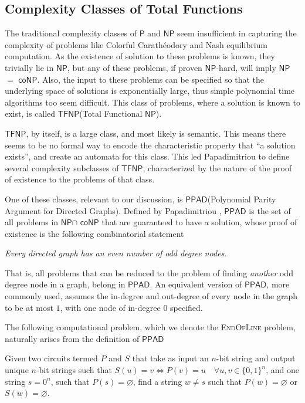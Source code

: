 \documentclass[a4paper,11pt]{article}
\def\cc#1{\mathsf{#1}}
\def\PPAD{\ensuremath{\cc{PPAD}}\xspace}
\def\P{\ensuremath{\cc{P}}\xspace}
\def\NP{\ensuremath{\cc{NP}}\xspace}
\def\TFNP{\ensuremath{\cc{TFNP}}\xspace}
\def\coNP{\ensuremath{\cc{coNP}}\xspace}
\def\problem#1{\textsc{#1}}
\def\EOL{\problem{EndOfLine}\xspace}
\def\CC{Colorful Carath\'eodory }
\begin{document}
\subsection{Complexity Classes of Total Functions}

\par The traditional complexity classes of \P and \NP seem insufficient in capturing the complexity of problems like \CC and Nash equilibrium computation. As the existence of solution to these problems is known, they trivially lie in \NP, but any of these problems, if proven \NP-hard, will imply \NP $=$ \coNP \cite{CP}. Also, the input to these problems can be specified so that the underlying space of solutions is exponentially large, thus simple polynomial time algorithms too seem difficult. This class of problems, where a solution is known to exist, is called \TFNP (Total Functional \NP). 

\par \TFNP, by itself, is a large class, and most likely is semantic. This means there seems to be no formal way to encode the characteristic property that ``a solution exists'', and create an automata for this class. This led Papadimitriou to define several complexity subclasses of \TFNP, characterized by the nature of the proof of existence to the problems of that class. 

\par One of these classes, relevant to our discussion, is \PPAD (Polynomial Parity Argument for Directed Graphs). Defined by Papadimitriou \cite{CP}, \PPAD is the set of all problems in \NP $\cap$ \coNP that are guaranteed to have a solution, whose proof of existence is the following combinatorial statement

\begin{center}
\textit{Every directed graph has an even number of odd degree nodes.}
\end{center}

\par That is, all problems that can be reduced to the problem of finding \textit{another} odd degree node in a graph, belong in \PPAD. An equivalent version of \PPAD, more commonly used, assumes the in-degree and out-degree of every node in the graph to be at most $1$, with one node of in-degree $0$ specified.  

\par The following computational problem, which we denote the \EOL problem, naturally arises from the definition of \PPAD

\begin{definition}[\EOL Problem]
Given two circuits termed $P$ and $S$ that take as input an $n$-bit string and output unique $n$-bit strings such that $S(u) = v \Leftrightarrow P(v) = u \quad \forall u,v \in \{ 0, 1 \}^n$, and one string $s = 0^n$, such that $P(s) = \varnothing$, find a string $w \neq s$ such that $P(w) = \varnothing$ or $S(w) = \varnothing$.  
\end{definition}
\end{document}

